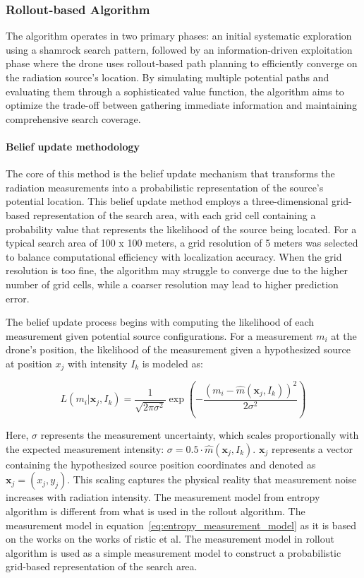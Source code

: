 \documentclass[../report.tex]{subfiles}
\begin{document}
    \subsubsection{Rollout-based Algorithm}
    The algorithm operates in two primary phases: an initial systematic exploration using a shamrock search pattern, followed by an information-driven exploitation 
    phase where the drone uses rollout-based path planning to efficiently converge on the radiation source's location. By simulating multiple potential paths and 
    evaluating them through a sophisticated value function, the algorithm aims to optimize the trade-off between gathering immediate information and maintaining 
    comprehensive search coverage.
    \paragraph{Belief update methodology}
    The core of this method is the belief update mechanism that transforms the radiation measurements into a probabilistic representation of the source's potential location. This belief update 
    method employs a three-dimensional grid-based representation of the search area, with each grid cell containing a probability value that represents the likelihood of the source being located.
    For a typical search area of 100 x 100 meters, a grid resolution of 5 meters was selected to balance computational efficiency with localization accuracy. When the grid 
    resolution is too fine, the algorithm may struggle to converge due to the higher number of grid cells, while a coarser resolution may lead to higher prediction error.

    The belief update process begins with computing the likelihood of each measurement given potential source configurations. For a measurement $m_i$ at the drone's position, the likelihood of 
    the measurement given a hypothesized source at position $x_j$ with intensity $I_k$ is modeled as:

    \begin{equation}
        L(m_i | \mathbf{x}_j, I_k) = \frac{1}{\sqrt{2\pi\sigma^2}} \exp\left(-\frac{(m_i - \hat{m}(\mathbf{x}_j, I_k))^2}{2\sigma^2}\right)
        \label{eq:rollout_likelihood}
    \end{equation}

    Here, $\sigma$ represents the measurement uncertainty, which scales proportionally with the expected measurement intensity: $\sigma = 0.5 \cdot \hat{m}(\mathbf{x}_j, I_k)$. 
    $\mathbf{x}_j$ represents a vector containing the hypothesized source position coordinates and denoted as $\mathbf{x}_j = (x_j, y_j)$. This scaling captures the physical reality that measurement 
    noise increases with radiation intensity. The measurement model from entropy algorithm is different from what is used in the rollout algorithm. The measurement 
    model in  equation~\ref{eq:entropy_measurement_model} as it is based on the works on the works of ristic et al. The measurement model in rollout algorithm 
    is used as a simple measurement model to construct a probabilistic grid-based representation of the search area.
\end{document}
